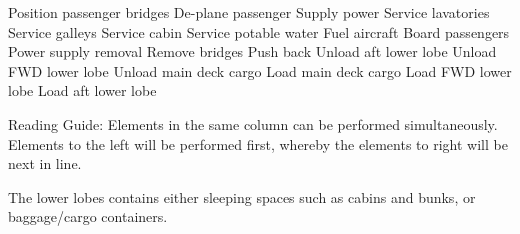 Position passenger bridges
	De-plane passenger
	Supply power
		Service lavatories
		Service galleys
		Service cabin
		Service potable water
		Fuel aircraft
			Board passengers
				Power supply removal
				Remove bridges
					Push back
	Unload aft lower lobe
	Unload FWD lower lobe
		Unload main deck cargo
			Load main deck cargo
			Load FWD lower lobe
			Load aft lower lobe
			  
			
Reading Guide:
	Elements in the same column can be performed simultaneously. 
	Elements to the left will be performed first, whereby the elements to right will be next in line.
	
The lower lobes contains either sleeping spaces such as cabins and bunks, or baggage/cargo containers\cite{Algo_lobe}.